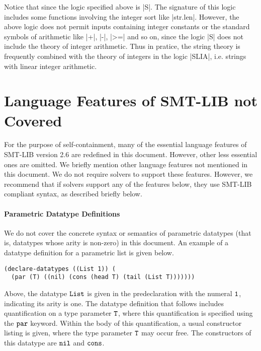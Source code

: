 \documentclass[english,a4paper,10pt]{article}
\begin{document}
\begin{appendix}
Notice that since the logic specified above is \code|S|.
The signature of this logic includes 
some functions involving the integer sort like \code|str.len|.
However, the above logic does not permit inputs containing
integer constants or the standard symbols of arithmetic like 
\code|+|, \code|-|, \code|>=| and so on, since the logic \code|S|
does not include the theory of integer arithmetic.
Thus in pratice, 
the string theory is frequently combined with the theory of integers
in the logic \code|SLIA|, i.e. strings with linear integer arithmetic.

\section{Language Features of SMT-LIB not Covered}%
\label{apx:not-covered}

For the purpose of self-containment,
many of the essential language features of SMT-LIB version 2.6
are redefined in this document.
However, other less essential ones are omitted.
We briefly mention other language features not mentioned in
this document.
We do not require solvers to support these features.
However, we recommend that if solvers support any of the features below,
they use SMT-LIB compliant syntax, as described briefly below.

\paragraph{Parametric Datatype Definitions}
We do not cover the concrete syntax or semantics of parametric datatypes (that
is, datatypes whose arity is non-zero) in this document.
An example of a datatype definition for a parametric list is given below.
\begin{lstlisting}
(declare-datatypes ((List 1)) (
  (par (T) ((nil) (cons (head T) (tail (List T)))))))
\end{lstlisting}
Above, the datatype ${\tt List}$ 
is given in the predeclaration with the numeral ${\tt 1}$, indicating
its arity is one.
The datatype definition that follows includes quantification on a type
parameter ${\tt T}$, where this quantification is specified using the 
${\tt par}$ keyword. Within the body of this quantification,
a usual constructor listing is given, where the type parameter ${\tt T}$
may occur free. The constructors of this datatype are ${\tt nil}$
and ${\tt cons}$.


\end{appendix}
\end{document}
